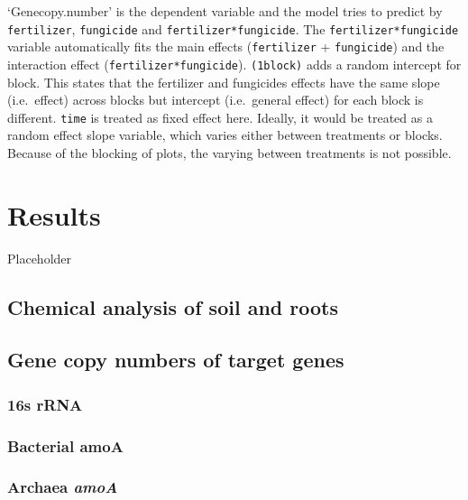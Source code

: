 \documentclass[twoside,12pt,final]{ucthesis-CA2012}
\begin{document}
\begin{ucmainmatter}
`Genecopy.number' is the dependent variable and the model tries to predict by \texttt{fertilizer}, \texttt{fungicide} and \texttt{fertilizer*fungicide}. The \texttt{fertilizer*fungicide} variable automatically fits the main effects (\texttt{fertilizer} + \texttt{fungicide}) and the interaction effect (\texttt{fertilizer*fungicide}). \texttt{(1\textbar{}block)} adds a random intercept for block. This states that the fertilizer and fungicides effects have the same slope (i.e.~effect) across blocks but intercept (i.e.~general effect) for each block is different. \texttt{time} is treated as fixed effect here. Ideally, it would be treated as a random effect slope variable, which varies either between treatments or blocks. Because of the blocking of plots, the varying between treatments is not possible.

\hypertarget{results}{%
\chapter*{Results}\label{results}}

Placeholder

\hypertarget{chemical-analysis-of-soil-and-roots}{%
\section{Chemical analysis of soil and roots}\label{chemical-analysis-of-soil-and-roots}}

\hypertarget{gene-copy-numbers-of-target-genes}{%
\section{Gene copy numbers of target genes}\label{gene-copy-numbers-of-target-genes}}

\hypertarget{s-rrna}{%
\subsection{16s rRNA}\label{s-rrna}}

\hypertarget{bacterial-amoa}{%
\subsection{Bacterial amoA}\label{bacterial-amoa}}

\hypertarget{archaea-amoa}{%
\subsection{\texorpdfstring{Archaea \emph{amoA}}{Archaea amoA}}\label{archaea-amoa}}


\end{ucmainmatter}
\end{document}
